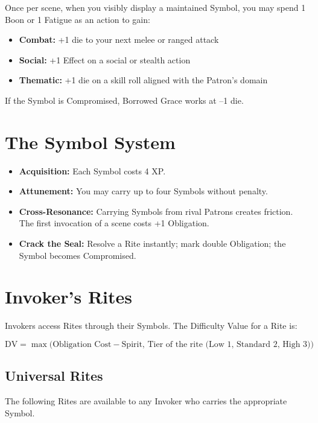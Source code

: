 Once per scene, when you visibly display a maintained Symbol, you may spend 1 Boon or 1 Fatigue as an action to gain:

\begin{itemize}
  \item \textbf{Combat:} +1 die to your next melee or ranged attack
  \item \textbf{Social:} +1 Effect on a social or stealth action
  \item \textbf{Thematic:} +1 die on a skill roll aligned with the Patron's domain
\end{itemize}

If the Symbol is Compromised, Borrowed Grace works at --1 die.

\section{The Symbol System}
\label{app:symbol-system}

\begin{itemize}
  \item \textbf{Acquisition:} Each Symbol costs 4 XP.
  \item \textbf{Attunement:} You may carry up to four Symbols without penalty.
  \item \textbf{Cross-Resonance:} Carrying Symbols from rival Patrons creates friction. The first invocation of a scene costs +1 Obligation.
  \item \textbf{Crack the Seal:} Resolve a Rite instantly; mark double Obligation; the Symbol becomes Compromised.
\end{itemize}

\section{Invoker's Rites}
\label{app:invoker-rites}

Invokers access Rites through their Symbols. The Difficulty Value for a Rite is:

\[
\text{DV} = \max\!\big(\text{Obligation Cost} - \text{Spirit}, \, \text{Tier of the rite (Low 1, Standard 2, High 3)}\big)
\]

\subsection{Universal Rites}

The following Rites are available to any Invoker who carries the appropriate Symbol.

